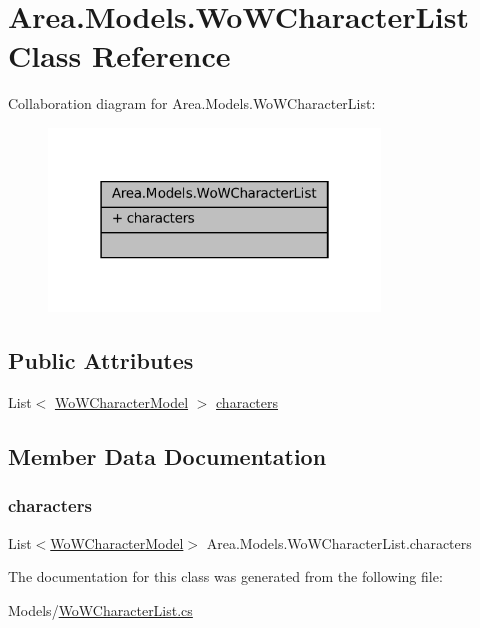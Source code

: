 \hypertarget{classArea_1_1Models_1_1WoWCharacterList}{}\section{Area.\+Models.\+Wo\+W\+Character\+List Class Reference}
\label{classArea_1_1Models_1_1WoWCharacterList}


Collaboration diagram for Area.\+Models.\+Wo\+W\+Character\+List\+:
\nopagebreak
\begin{figure}[H]
\begin{center}
\leavevmode
\includegraphics[width=250pt]{classArea_1_1Models_1_1WoWCharacterList__coll__graph}
\end{center}
\end{figure}
\subsection*{Public Attributes}
\begin{DoxyCompactItemize}
\item 
List$<$ \mbox{\hyperlink{classArea_1_1Models_1_1WoWCharacterModel}{Wo\+W\+Character\+Model}} $>$ \mbox{\hyperlink{classArea_1_1Models_1_1WoWCharacterList_aab9e3565e92a78a594eb9d217ca0611f}{characters}}
\end{DoxyCompactItemize}


\subsection{Member Data Documentation}
\mbox{\label{classArea_1_1Models_1_1WoWCharacterList_aab9e3565e92a78a594eb9d217ca0611f}} 
\subsubsection{\texorpdfstring{characters}{characters}}
{\footnotesize\ttfamily List$<$\mbox{\hyperlink{classArea_1_1Models_1_1WoWCharacterModel}{Wo\+W\+Character\+Model}}$>$ Area.\+Models.\+Wo\+W\+Character\+List.\+characters}



The documentation for this class was generated from the following file\+:\begin{DoxyCompactItemize}
\item 
Models/\mbox{\hyperlink{WoWCharacterList_8cs}{Wo\+W\+Character\+List.\+cs}}\end{DoxyCompactItemize}
